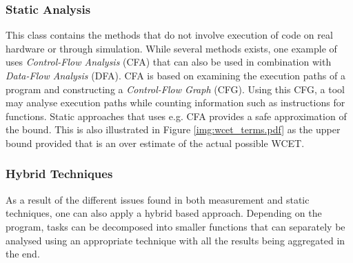 \subsubsection{Static Analysis}
This class contains the methods that do not involve execution of code on real hardware or through simulation. While several methods exists, one example of uses \textit{Control-Flow Analysis} (CFA) that can also be used in combination with \textit{Data-Flow Analysis} (DFA). CFA is based on examining the execution paths of a program and constructing a \textit{Control-Flow Graph} (CFG). Using this CFG, a tool may analyse execution paths while counting information such as instructions for functions.
Static approaches that uses e.g. CFA provides a safe approximation of the bound. This is also illustrated in Figure \ref{img:wcet_terms.pdf} as the upper bound provided that is an over estimate of the actual possible WCET. 

\subsubsection{Hybrid Techniques}
As a result of the different issues found in both measurement and static techniques, one can also apply a hybrid based approach. Depending on the program, tasks can be decomposed into smaller functions that can separately be analysed using an appropriate technique with all the results being aggregated in the end.


